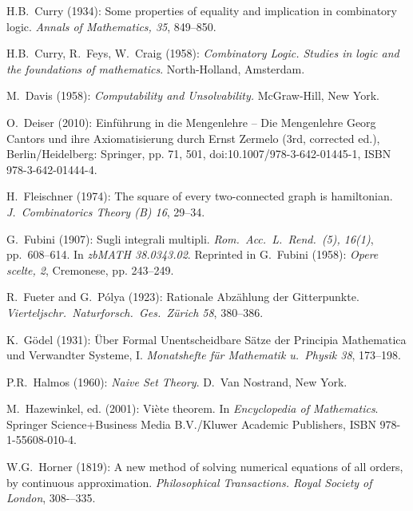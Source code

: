 \begin{thebibliography}{999}
H.B.~Curry (1934): Some properties of equality and implication in
combinatory logic.  {\it Annals of Mathematics, 35}, 849--850.

H.B.~Curry, R.~Feys, W.~Craig (1958):
{\it Combinatory Logic.  Studies in logic and the foundations of
mathematics}.  North-Holland, Amsterdam.


M.~Davis (1958):
{\it Computability and Unsolvability.}
McGraw-Hill, New York.

O.~Deiser (2010): Einf\"{u}hrung in die Mengenlehre – Die Mengenlehre
Georg Cantors und ihre Axiomatisierung durch Ernst Zermelo (3rd,
corrected ed.), Berlin/Heidelberg: Springer, pp. 71, 501,
doi:10.1007/978-3-642-01445-1, ISBN 978-3-642-01444-4.



H.~Fleischner (1974):
The square of every two-connected graph is hamiltonian.
{\it J.~Combinatorics Theory (B) 16}, 29--34.

G.~Fubini (1907): Sugli integrali multipli.
{\it Rom.~Acc.~L.~Rend.~(5), 16(1)}, pp.~608–614.  In {\it zbMATH
  38.0343.02}.  Reprinted in
G.~Fubini (1958): {\it Opere scelte, 2}, Cremonese, pp. 243–249.

R.~Fueter and G.~P\'{o}lya (1923):
Rationale Abz\"{a}hlung der Gitterpunkte.  {\it
Vierteljschr.~Naturforsch.~Ges.~Z\"{u}rich 58}, 380--386.


K.~G\"{o}del (1931): \"{U}ber Formal Unentscheidbare S\"{a}tze der
Principia Mathematica und Verwandter Systeme, I.  {\it Monatshefte
f\"{u}r Mathematik u.~Physik 38}, 173--198.



P.R.~Halmos (1960):
{\it Naive Set Theory}.
D.~Van Nostrand, New York.

M.~Hazewinkel, ed. (2001): %
Vi\`{e}te theorem.  In {\it Encyclopedia of Mathematics}.
Springer Science+Business Media B.V./Kluwer Academic Publishers,
ISBN 978-1-55608-010-4.

W.G.~Horner (1819): 
A new method of solving numerical equations of all orders, by
continuous approximation. {\it Philosophical Transactions. Royal
Society of London}, 308-–335.





\end{thebibliography}
